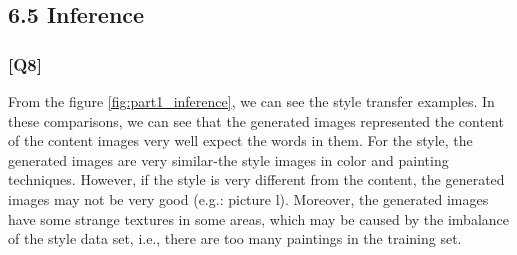 \documentclass{article}
\begin{document}
\subsection*{6.5 Inference}

\subsubsection*{[Q8]}

From the figure \ref{fig:part1_inference}, we can see the style transfer examples.
In these comparisons, we can see that the generated images represented the content of the content images very well expect the words in them.
For the style, the generated images are very similar-the style images in color and painting techniques.
However, if the style is very different from the content, the generated images may not be very good (e.g.: picture l).
Moreover, the generated images have some strange textures in some areas, which may be caused by the imbalance of the style data set, i.e., there are too many paintings in the training set.
\end{document}
